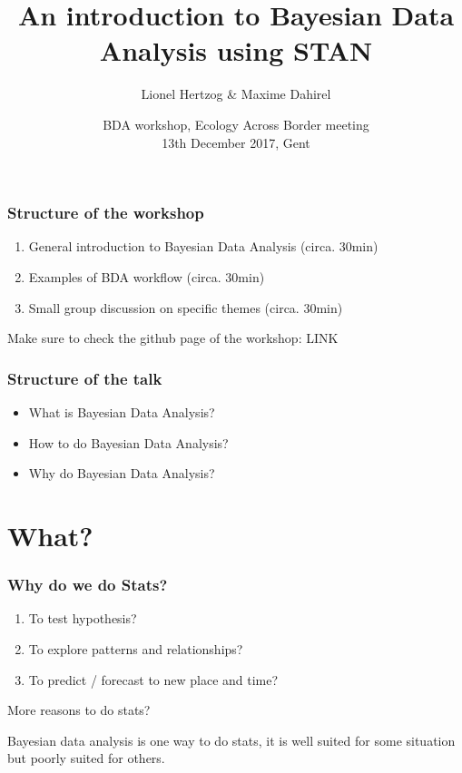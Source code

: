 \documentclass{beamer}
\title{An introduction to Bayesian Data Analysis using STAN}
\subtitle{}
\author{Lionel Hertzog \& Maxime Dahirel}
\date{BDA workshop, Ecology Across Border meeting\\ 13th December 2017, Gent}
\begin{document}
 
 \frame{\titlepage}
 

\begin{frame}
 \frametitle{\bf Structure of the workshop}
  \begin{enumerate}
   \item General introduction to Bayesian Data Analysis (circa. 30min)
   \item Examples of BDA workflow (circa. 30min)
   \item Small group discussion on specific themes (circa. 30min)
  \end{enumerate}
  
  Make sure to check the github page of the workshop: LINK

 
 \end{frame}
 
\begin{frame}
 \frametitle{\bf Structure of the talk}
  \begin{itemize}
   \item What is Bayesian Data Analysis?
   \item How to do Bayesian Data Analysis?
   \item Why do Bayesian Data Analysis?
  \end{itemize}

 
 \end{frame} 
 
 
\section*{What?} 
 
 \begin{frame}
  \frametitle{\bf Why do we do Stats?}
  
  \begin{enumerate}
   \item To test hypothesis?
   \item To explore patterns and relationships?
   \item To predict / forecast to new place and time?
  \end{enumerate}

  \vspace*{0.5cm}

  More reasons to do stats?
  
  \vspace*{0.2cm}
  
  Bayesian data analysis is one way to do stats, it is well suited for some situation but poorly suited for others.
  
  
  
  
 \end{frame}
\end{document}
